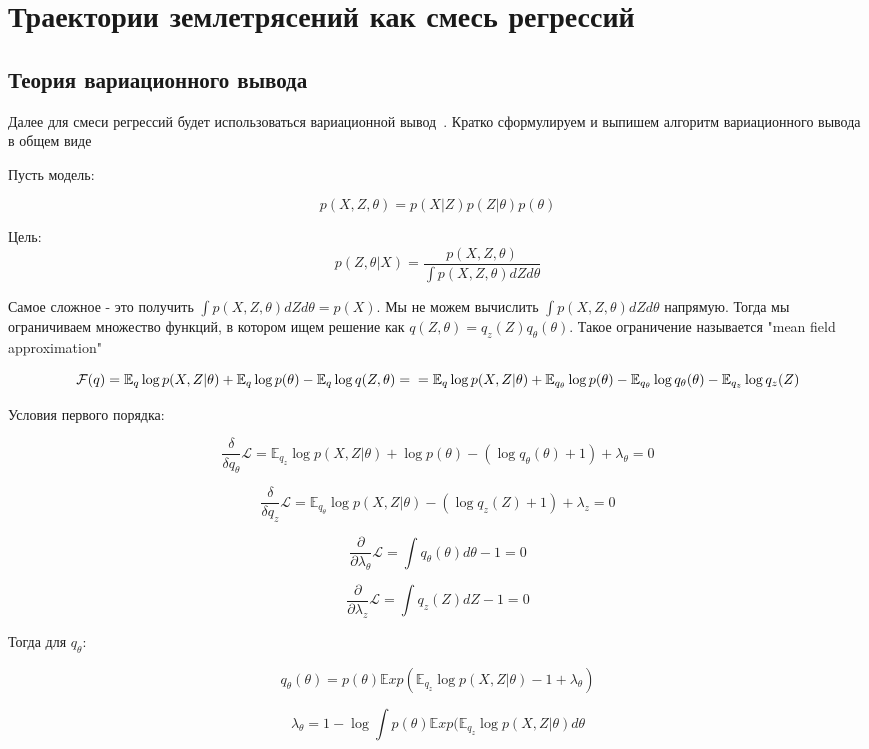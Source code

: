 \section{Траектории землетрясений как смесь регрессий}
\subsection{Теория вариационного вывода}
Далее для смеси регрессий будет использоваться вариационной вывод~\cite{mean_field}. Кратко сформулируем и выпишем алгоритм вариационного вывода в общем виде

Пусть модель:

$$
p(X, Z, \theta) = p(X|Z)p(Z|\theta)p(\theta)
$$

Цель:
$$
p(Z,\theta|X) = \dfrac{p(X, Z, \theta)}{\int p(X, Z, \theta) dZd\theta}
$$

Самое сложное - это получить $\int p(X, Z, \theta) dZd\theta = p(X)$. Мы не можем вычислить $\int p(X, Z,\theta)dZd\theta$ напрямую. Тогда мы ограничиваем множество функций, в котором ищем решение как $q(Z,\theta) = q_z(Z)q_{\theta}(\theta)$. Такое ограничение называется "mean field approximation"

$$
\mathcal{F}(q) = \mathbb{E}_q  \log p(X,Z|\theta) + \mathbb{E}_q  \log p(\theta) - \mathbb{E}_q \log q(Z, \theta) = \\
= \mathbb{E}_q  \log p(X,Z|\theta) + \mathbb{E}_{q_{\theta}}  \log p(\theta) - \mathbb{E}_{q_{\theta}} \log q_{\theta}
(\theta) - \mathbb{E}_{q_{z}}  \log q_{z}(Z)
$$

Условия первого порядка:

$$
\dfrac{\delta}{\delta q_{\theta}}\mathcal{L} = \mathbb{E}_{q_{z}}
 \log p(X,Z|\theta) +  \log p(\theta) - ( \log q_{\theta}(\theta)+1) + \lambda_{\theta} = 0 
$$

$$
\dfrac{\delta}{\delta q_{z}}\mathcal{L} = \mathbb{E}_{q_{\theta}}
 \log p(X,Z|\theta) - ( \log q_{z}(Z)+1) + \lambda_z = 0 
$$

$$
\dfrac{\partial}{\partial \lambda_{\theta}}\mathcal{L} = \int q_{\theta}(\theta)d\theta - 1 = 0
$$

$$
\dfrac{\partial}{\partial \lambda_{z}}\mathcal{L} = \int q_{z}(Z)dZ - 1 = 0
$$

Тогда для $q_\theta$:

$$
q_{\theta}(\theta) = p(\theta) \mathbb{E}xp(\mathbb{E}_{q_{z}} \log p(X,Z|\theta)-1+\lambda_{\theta})
$$

$$
\lambda_{\theta} = 1 -  \log\int p(\theta) \mathbb{E}xp(\mathbb{E}_{q_{z}} \log p(X,Z|\theta)d\theta
$$

